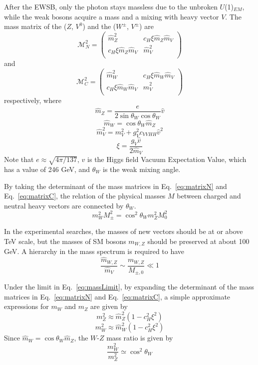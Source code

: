 After the EWSB, only the photon stays massless due to the unbroken $U$(1)$_{EM}$, while the weak bosons acquire a mass and a mixing with heavy vector $V$. The mass matrix of the ($Z$, $V^0$) and the ($W^\pm$, $V^\pm$) are 
\begin{equation} \label{eq:matrixN}
  \mathcal{M}_N^2 =
  \begin{pmatrix}
    \hat{m}_Z^2 &
    c_H\xi\hat{m}_Z\hat{m}_V \\
    c_H\xi\hat{m}_Z\hat{m}_V &
    \hat{m}_V^2 \\
  \end{pmatrix}
\end{equation}
and
\begin{equation} \label{eq:matrixC}
  \mathcal{M}_C^2 =
  \begin{pmatrix}
    \hat{m}_W^2 &
    c_H\xi\hat{m}_W\hat{m}_V \\
    c_H\xi\hat{m}_W\hat{m}_V &
    \hat{m}_V^2 \\
  \end{pmatrix}
\end{equation}
respectively, where
\[\hat{m}_Z = \frac{e}{2\sin\theta_W\cos\theta_W}\hat{v}\]
\[\hat{m}_W = \cos\theta_W\hat{m}_Z\]
\[\hat{m}_V^2 = m_V^2 + g_V^2c_{VVHH}\hat{v}^2\]
\[\xi = \frac{g_V\hat{v}}{2\hat{m}_V}\]
Note that $e \approx \sqrt{4\pi/137}$, $\hat{v}$ is the Higgs field Vacuum Expectation Value, which has a value of 246 GeV, and $\theta_W$ is the weak mixing angle.

By taking the determinant of the mass matrices in Eq.~\ref{eq:matrixN} and Eq.~\ref{eq:matrixC}, the relation of the physical masses $M$ between charged and neutral heavy vectors are connected by $\theta_W$.
\begin{equation}
  m_W^2M_\pm^2 = \cos^2\theta_Wm_Z^2M_0^2
\end{equation}

In the experimental searches, the masses of new vectors should be at or above TeV scale, but the masses of SM bosons $m_{W,Z}$ should be preserved at about 100 GeV. A hierarchy in the mass spectrum is required to have
\begin{equation} \label{eq:massLimit}
  \frac{\hat{m}_{W,Z}}{\hat{m}_V} \sim \frac{m_{W,Z}}{M_{\pm,0}} \ll 1
\end{equation}

Under the limit in Eq.~\ref{eq:massLimit}, by expanding the determinant of the mass matrices in Eq.~\ref{eq:matrixN} and Eq.~\ref{eq:matrixC}, a simple approximate expressions for $m_W$ and $m_Z$ are given by
\[m_Z^2 \approx \hat{m}_Z^2(1-c_H^2\xi^2)\]
\[m_W^2 \approx \hat{m}_W^2(1-c_H^2\xi^2)\]
Since $\hat{m}_W = \cos\theta_W\hat{m}_Z$, the $W$-$Z$ mass ratio is given by 
\begin{equation} \label{eq:weakMass}
  \frac{m_W^2}{m_Z^2} \simeq \cos^2\theta_W
\end{equation}

